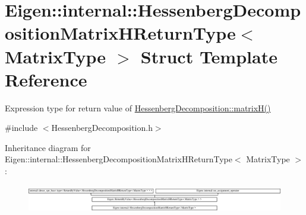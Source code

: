 \hypertarget{struct_eigen_1_1internal_1_1_hessenberg_decomposition_matrix_h_return_type}{}\section{Eigen\+::internal\+::Hessenberg\+Decomposition\+Matrix\+H\+Return\+Type$<$ Matrix\+Type $>$ Struct Template Reference}
\label{struct_eigen_1_1internal_1_1_hessenberg_decomposition_matrix_h_return_type}


Expression type for return value of \mbox{\hyperlink{class_eigen_1_1_hessenberg_decomposition_a8e781d2e22a2304647bcf0ae913cc8ea}{Hessenberg\+Decomposition\+::matrix\+H()}}  




{\ttfamily \#include $<$Hessenberg\+Decomposition.\+h$>$}

Inheritance diagram for Eigen\+::internal\+::Hessenberg\+Decomposition\+Matrix\+H\+Return\+Type$<$ Matrix\+Type $>$\+:\begin{figure}[H]
\begin{center}
\leavevmode
\includegraphics[height=1.253731cm]{struct_eigen_1_1internal_1_1_hessenberg_decomposition_matrix_h_return_type}
\end{center}
\end{figure}
